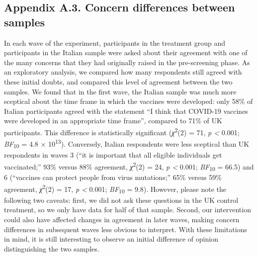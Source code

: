 \documentclass[authordate, empirical]{jote-new-article}
\begin{document}
	\subsection{Appendix A.3. Concern differences between samples}



	In each wave of the experiment, participants in the treatment group and participants in the Italian sample were asked about their agreement with one of the many concerns that they had originally raised in the pre-screening phase. As an exploratory analysis, we compared how many respondents still agreed with these initial doubts, and compared this level of agreement between the two samples. We found that in the first wave, the Italian sample was much more sceptical about the time frame in which the vaccines were developed: only 58\% of Italian participants agreed with the statement “I think that COVID-19 vaccines were developed in an appropriate time frame”, compared to 71\% of UK participants. This difference is statistically significant (\emph{χ}\textsuperscript{2}(2) = 71, \emph{p < }0.001; \emph{BF}\textsubscript{10 }= 4.8 × 10\textsuperscript{13}). Conversely, Italian respondents were less sceptical than UK respondents in waves 3 (“it is important that all eligible individuals get vaccinated;” 93\% versus 88\% agreement, \emph{χ}\textsuperscript{2}(2) = 24, \emph{p < }0.001; \emph{BF}\textsubscript{10 }= 66.5) and 6 (“vaccines can protect people from virus mutations;” 65\% versus 59\% agreement, \emph{χ}\textsuperscript{2}(2) = 17, \emph{p < }0.001; \emph{BF}\textsubscript{10 }= 9.8). However, please note the following two caveats: first, we did not ask these questions in the UK control treatment, so we only have data for half of that sample. Second, our intervention could also have affected changes in agreement in later waves, making concern differences in subsequent waves less obvious to interpret. With these limitations in mind, it is still interesting to observe an initial difference of opinion distinguishing the two samples.
\end{document}
